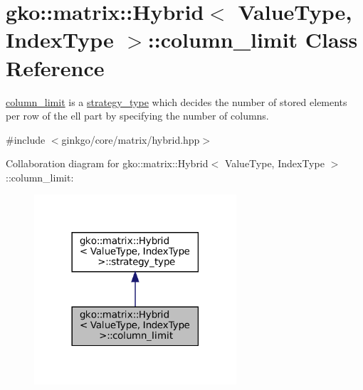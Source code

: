 \hypertarget{classgko_1_1matrix_1_1Hybrid_1_1column__limit}{}\section{gko\+:\+:matrix\+:\+:Hybrid$<$ Value\+Type, Index\+Type $>$\+:\+:column\+\_\+limit Class Reference}
\label{classgko_1_1matrix_1_1Hybrid_1_1column__limit}


\hyperlink{classgko_1_1matrix_1_1Hybrid_1_1column__limit}{column\+\_\+limit} is a \hyperlink{classgko_1_1matrix_1_1Hybrid_1_1strategy__type}{strategy\+\_\+type} which decides the number of stored elements per row of the ell part by specifying the number of columns.  




{\ttfamily \#include $<$ginkgo/core/matrix/hybrid.\+hpp$>$}



Collaboration diagram for gko\+:\+:matrix\+:\+:Hybrid$<$ Value\+Type, Index\+Type $>$\+:\+:column\+\_\+limit\+:
\nopagebreak
\begin{figure}[H]
\begin{center}
\leavevmode
\includegraphics[width=213pt]{classgko_1_1matrix_1_1Hybrid_1_1column__limit__coll__graph}
\end{center}
\end{figure}
